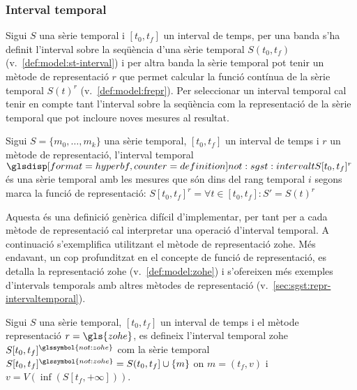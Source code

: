\subsubsection{Interval temporal}

Sigui $S$ una sèrie temporal i $[t_0,t_f]$ un interval de temps, per
una banda s'ha definit l'interval sobre la seqüència d'una sèrie
temporal $S(t_0,t_f)$ (v.\ \autoref{def:model:st-interval}) i per
altra banda la sèrie temporal pot tenir un mètode de representació $r$
que permet calcular la funció contínua de la sèrie temporal $S(t)^r$
(v.\ \autoref{def:model:frepr}).  Per seleccionar un interval temporal
cal tenir en compte tant l'interval sobre la seqüència com la
representació de la sèrie temporal que pot incloure noves mesures al
resultat.

\begin{definition}
  \label{def:sgst:intervalt}
  Sigui $S=\{m_0, \ldots, m_k\}$ una sèrie temporal, $[t_0,t_f]$ un
  interval de temps i $r$ un mètode de representació, l'interval
  temporal $\glsdispdef{not:sgst:intervalt}{S[t_0,t_f]^r}$ és una
  sèrie temporal amb les mesures que són dins del rang temporal $i$
  segons marca la funció de representació: $S[t_0,t_f]^r= \forall t
  \in [t_0,t_f] : S' = S(t)^r$
\end{definition}

Aquesta és una definició genèrica difícil d'implementar, per tant per
a cada mètode de representació cal interpretar una operació d'interval
temporal.  A continuació s'exemplifica utilitzant el mètode de
representació \gls{zohe}. Més endavant, un cop profunditzat en el
concepte de funció de representació, es detalla la representació
\gls{zohe} (v.\ \autoref{def:model:zohe}) i s'ofereixen més exemples
d'intervals temporals amb altres mètodes de representació (v.\
\autoref{sec:sgst:repr-intervaltemporal}).
\begin{definition}
  \label{def:sgst:interval-temporal-zohe}
  Sigui $S$ una sèrie temporal, $[t_0,t_f]$ un interval de temps i el
  mètode representació $r=\gls{zohe}$, es defineix l'interval temporal
  \gls{zohe} $S[t_0,t_f]^{\glssymbol{not:zohe}}$ com la sèrie temporal
    $S[t_0,t_f]^{\glssymbol{not:zohe}} = S(t_0,t_f] \cup \{m\}$ on $m=(t_f,v)$
    i $v= V(\inf( S[t_f,+\infty] ))$.
\end{definition}



